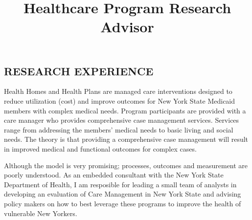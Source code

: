\documentclass[line, margin, 10pt]{res}
\begin{document}
 

\address{andy.choens@gmail.com  (518) 275 - 5984}
\address{(518) 275 - 5984}

\begin{resume}


  \section{RESEARCH EXPERIENCE}


  \title{Healthcare Program Research Advisor}
  \begin{position}
    Health Homes and Health Plans are managed care interventions
    designed to reduce utilization (cost) and improve outcomes for New
    York State Medicaid members with complex medical needs. Program
    participants are provided with a care manager who provides
    comprehensive case management services. Services range from
    addressing the members' medical needs to basic living and social
    needs. The theory is that providing a comprehensive case
    management will result in improved medical and functional outcomes
    for complex cases.

    Although the model is very promising; processes, outcomes and
    measurement are poorly understood. As an embedded consultant with
    the New York State Department of Health, I am resposible for
    leading a small team of analysts in developing an evaluation of
    Care Management in New York State and advising policy makers on
    how to best leverage these programs to improve the health of
    vulnerable New Yorkers.
  \end{position}


\end{resume}
\end{document}

